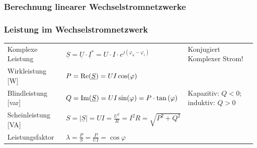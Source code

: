 		\subsubsection{Berechnung linearer Wechselstromnetzwerke}
		
		\subsubsection{Leistung im Wechselstromnetzwerk}%
				\begin{tabular}{p{4.5cm}p{7cm}p{7cm}}
					Komplexe Leistung &
						$ \underline{S} = \underline{U} \cdot \underline{I}^\ast = U\cdot I \cdot e^{j(\varphi_u-\varphi_i)}$   &
						Konjugiert Komplexer Strom! \\
					Wirkleistung [W] &
						$ P = \operatorname{Re}(\underline{S}) = U I \cos(\varphi) $ \\
					Blindleistung [var] &
						$ Q = \operatorname{Im}(\underline{S}) = U I \sin(\varphi)  = P \cdot
						\tan\left(\varphi\right)$ & Kapazitiv: $Q < 0$; induktiv: $Q > 0$ \\
					Scheinleistung [VA] &
						$ S = | \underline{S} | = U I = \frac{U^2}{R} = I^2 R = \sqrt{P^2+Q^2}$ \\
					Leistungsfaktor &
						$\lambda = \frac{P}{S} = \frac{P}{UI} = \cos \varphi$ \\
				\end{tabular}
